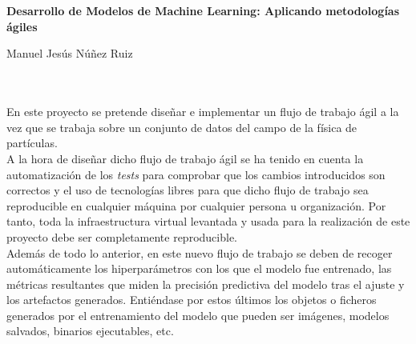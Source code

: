 \chapter*{}




\cleardoublepage
\thispagestyle{empty}

\begin{center}
{\large\bfseries Desarrollo de Modelos de Machine Learning: Aplicando metodologías ágiles}\\
\end{center}
\begin{center}
Manuel Jesús Núñez Ruiz\\
\end{center}

\\

\vspace{0.7cm}
\\

En este proyecto se pretende diseñar e implementar un flujo de trabajo ágil a la vez que se trabaja sobre un conjunto de datos del campo de la física de partículas.\\

A la hora de diseñar dicho flujo de trabajo ágil se ha tenido en cuenta la automatización de los \textit{tests} para comprobar que los cambios introducidos son correctos y el uso de tecnologías libres para que dicho flujo de trabajo sea reproducible en cualquier máquina por cualquier persona u organización. Por tanto, toda la infraestructura virtual levantada y usada para la realización de este proyecto debe ser completamente reproducible.\\

Además de todo lo anterior, en este nuevo flujo de trabajo se deben de recoger automáticamente los hiperparámetros con los que el modelo fue entrenado, las métricas resultantes que miden la precisión predictiva del modelo tras el ajuste y los artefactos generados. Entiéndase por estos últimos los objetos o ficheros generados por el entrenamiento del modelo que pueden ser imágenes, modelos salvados, binarios ejecutables, etc.\\

